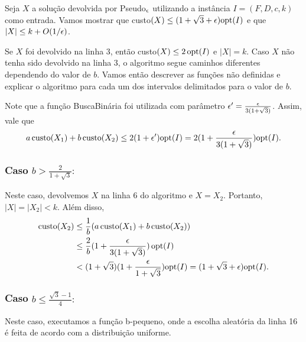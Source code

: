 Seja $X$ a solução devolvida por {\sc Pseudo}$_\epsilon$ utilizando a instância ${I = (F,D,c,k)}$ como entrada. Vamos mostrar que custo$(X) \leq (1 + \sqrt{3} + \epsilon) \mathrm{opt}(I)$ 
e que $|X| \leq k + O(1/\epsilon)$.

Se $X$ foi devolvido na linha 3, então custo$(X) \leq 2 \, \mathrm{opt}(I)$ e $|X| = k$. Caso $X$ não tenha sido devolvido na linha 3, o algoritmo segue caminhos diferentes dependendo do valor de $b$. Vamos então descrever as funções não definidas e explicar o algoritmo para cada um dos intervalos delimitados para o valor de $b$.

Note que a função {\sc BuscaBinária} foi utilizada com parâmetro $\epsilon' = \frac{\epsilon}{3(1 + \sqrt{3})}$. Assim, vale que
\begin{align*}
    a\,\text{custo}(X_1) + b\,\text{custo}(X_2) \leq 2(1 + \epsilon') \mathrm{opt}(I) = 2(1 + \frac{\epsilon}{3(1 + \sqrt{3})} )\mathrm{opt}(I). \nonumber
\end{align*}

\subsubsection*{Caso $b > \frac{2}{1+\sqrt{3}}:$}

Neste caso, devolvemos $X$ na linha 6 do algoritmo e $X = X_2$. Portanto, $|X| = |X_2| < k$. Além disso,
\begin{align*}
    \text{custo}(X_2) &\leq \frac{1}{b} ( a \, \text{custo}(X_1) + b \, \text{custo}(X_2)) \\
    &\leq \frac{2}{b} (1 + \frac{\epsilon}{3(1+\sqrt{3})})\, \mathrm{opt}(I) \\
    &< (1 + \sqrt{3})(1 + \frac{\epsilon}{1 + \sqrt{3}})\mathrm{opt}(I) = (1 + \sqrt{3} + \epsilon) \mathrm{opt}(I).
\end{align*}

\subsubsection*{Caso $b \leq \frac{\sqrt{3} - 1}{4}:$}

Neste caso, executamos a função {\sc b-pequeno}, onde a escolha aleatória da linha 16 é feita de acordo com a distribuição uniforme.

